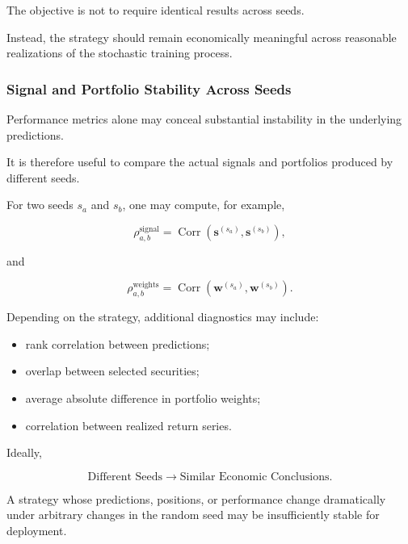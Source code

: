 \documentclass[11pt,a4paper]{article}
\begin{document}
The objective is not to require identical results across seeds.

Instead, the strategy should remain economically meaningful across reasonable
realizations of the stochastic training process.


\subsubsection{Signal and Portfolio Stability Across Seeds}

Performance metrics alone may conceal substantial instability in the underlying
predictions.

It is therefore useful to compare the actual signals and portfolios produced by
different seeds.

For two seeds $s_a$ and $s_b$, one may compute, for example,

\begin{equation}
\boxed{
\rho^{\mathrm{signal}}_{a,b}
=
\operatorname{Corr}
\left(
\mathbf{s}^{(s_a)},
\mathbf{s}^{(s_b)}
\right),
}
\end{equation}

and

\begin{equation}
\boxed{
\rho^{\mathrm{weights}}_{a,b}
=
\operatorname{Corr}
\left(
\mathbf{w}^{(s_a)},
\mathbf{w}^{(s_b)}
\right).
}
\end{equation}

Depending on the strategy, additional diagnostics may include:

\begin{itemize}
    \item rank correlation between predictions;
    \item overlap between selected securities;
    \item average absolute difference in portfolio weights;
    \item correlation between realized return series.
\end{itemize}

Ideally,

\begin{equation}
\boxed{
\text{Different Seeds}
\rightarrow
\text{Similar Economic Conclusions}.
}
\end{equation}

A strategy whose predictions, positions, or performance change dramatically
under arbitrary changes in the random seed may be insufficiently stable for
deployment.
\end{document}
